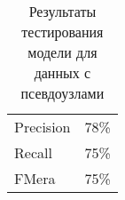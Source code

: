 \begin{table}[h]
\begin{tabular}{|l|l|}
\hline
\multirow{2}{*}{Precision} & \multirow{2}{*}{78\%} \\
 &  \\ \hline
\multirow{2}{*}{Recall} & \multirow{2}{*}{75\%} \\
 &  \\ \hline
\multirow{2}{*}{FMera} & \multirow{2}{*}{75\%} \\
 &  \\ \hline
\end{tabular}
\caption{Результаты тестирования модели для данных с псевдоузлами}
\label{table4}
\end{table}